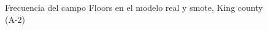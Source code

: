 \begin{figure}[H]
    \centering
    
    \caption{Frecuencia del campo Floors en el modelo real y smote, King county (A-2)}
    \label{frecuency-smote-floors}
\end{figure}